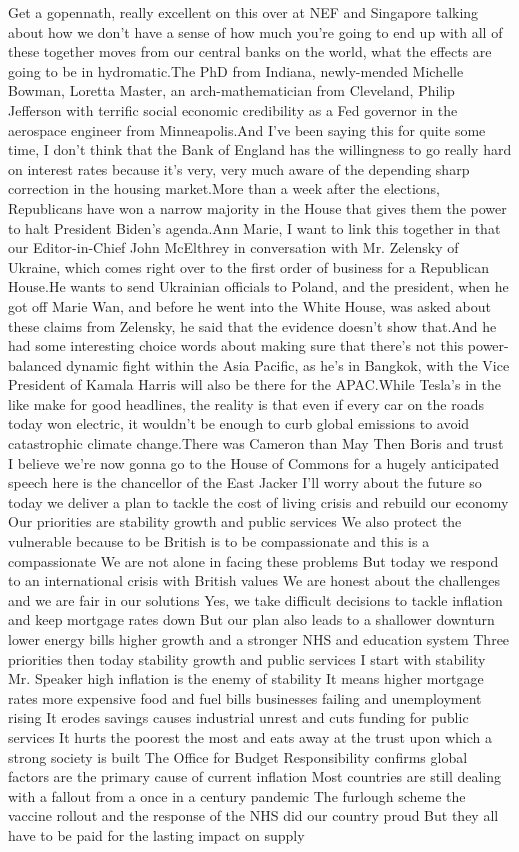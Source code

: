 \documentclass{article}%
\begin{document}
Get a gopennath, really excellent on this over at NEF and Singapore talking about how we don't have a sense of how much you're going to end up with all of these together moves from our central banks on the world, what the effects are going to be in hydromatic.The PhD from Indiana, newly{-}mended Michelle Bowman, Loretta Master, an arch{-}mathematician from Cleveland, Philip Jefferson with terrific social economic credibility as a Fed governor in the aerospace engineer from Minneapolis.And I've been saying this for quite some time, I don't think that the Bank of England has the willingness to go really hard on interest rates because it's very, very much aware of the depending sharp correction in the housing market.More than a week after the elections, Republicans have won a narrow majority in the House that gives them the power to halt President Biden's agenda.Ann Marie, I want to link this together in that our Editor{-}in{-}Chief John McElthrey in conversation with Mr. Zelensky of Ukraine, which comes right over to the first order of business for a Republican House.He wants to send Ukrainian officials to Poland, and the president, when he got off Marie Wan, and before he went into the White House, was asked about these claims from Zelensky, he said that the evidence doesn't show that.And he had some interesting choice words about making sure that there's not this power{-}balanced dynamic fight within the Asia Pacific, as he's in Bangkok, with the Vice President of Kamala Harris will also be there for the APAC.While Tesla's in the like make for good headlines, the reality is that even if every car on the roads today won electric, it wouldn't be enough to curb global emissions to avoid catastrophic climate change.There was Cameron than May Then Boris and trust I believe we're now gonna go to the House of Commons for a hugely anticipated speech here is the chancellor of the East Jacker I'll worry about the future so today we deliver a plan to tackle the cost of living crisis and rebuild our economy Our priorities are stability growth and public services We also protect the vulnerable because to be British is to be compassionate and this is a compassionate We are not alone in facing these problems But today we respond to an international crisis with British values We are honest about the challenges and we are fair in our solutions Yes, we take difficult decisions to tackle inflation and keep mortgage rates down But our plan also leads to a shallower downturn lower energy bills higher growth and a stronger NHS and education system Three priorities then today stability growth and public services I start with stability Mr. Speaker high inflation is the enemy of stability It means higher mortgage rates more expensive food and fuel bills businesses failing and unemployment rising It erodes savings causes industrial unrest and cuts funding for public services It hurts the poorest the most and eats away at the trust upon which a strong society is built The Office for Budget Responsibility confirms global factors are the primary cause of current inflation Most countries are still dealing with a fallout from a once in a century pandemic The furlough scheme the vaccine rollout and the response of the NHS did our country proud But they all have to be paid for the lasting impact on supply 
\end{document}
